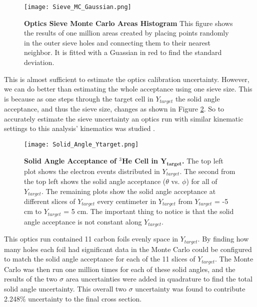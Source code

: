 \begin{figure}[!ht]
\begin{center}
\texttt{[image: Sieve\_MC\_Gaussian.png]}
\end{center}
\caption[Optics Sieve Monte Carlo Areas Histogram]{
{\bf{Optics Sieve Monte Carlo Areas Histogram}} This figure shows the results of one million areas created by placing points randomly in the outer sieve holes and connecting them to their nearest neighbor. It is fitted with a Guassian in red to find the standard deviation.}
\label{fig:sieve_mc_gaussian}
\end{figure}

This is almost sufficient to estimate the optics calibration uncertainty. However, we can do better than estimating the whole acceptance using one sieve size. This is because as one steps through the target cell in $Y_{target}$ the solid angle acceptance, and thus the sieve size, changes as shown in Figure \ref{fig:solid_angle_ytarget}. So to accurately estimate the sieve uncertainty an optics run with similar kinematic settings to this analysis' kinematics was studied \cite{shujie_optics}. 

\begin{figure}[!ht]
\begin{center}
\texttt{[image: Solid\_Angle\_Ytarget.png]}
\end{center}
\caption[Solid Angle Acceptance of $^3$He Cell in $Y_{target}$]{
{\bf{Solid Angle Acceptance of $^3$He Cell in $\boldsymbol{Y_{target}}$.}} The top left plot shows the electron events distributed in $Y_{target}$. The second from the top left shows the solid angle acceptance ($\theta$ vs. $\phi$) for all of $Y_{target}$. The remaining plots show the solid angle acceptance at different slices of $Y_{target}$ every centimeter in $Y_{target}$ from $Y_{target}$ = -5 cm to $Y_{target}$ = 5 cm. The important thing to notice is that the solid angle acceptance is not constant along $Y_{target}$.}
\label{fig:solid_angle_ytarget}
\end{figure}

This optics run contained 11 carbon foils evenly space in $Y_{target}$. By finding how many holes each foil had significant data in the Monte Carlo could be configured to match the solid angle acceptance for each of the 11 slices of $Y_{target}$. The Monte Carlo was then run one million times for each of these solid angles, and the results of the two $\sigma$ area uncertainties were added in quadrature to find the total solid angle uncertainty. This overall two $\sigma$ uncertainty was found to contribute 2.248$\%$ uncertainty to the final cross section.


